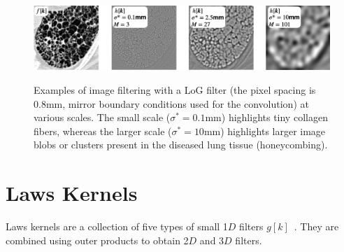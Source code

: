 \documentclass[fleqn,a4paper,oneside,openany]{book}
\begin{document}
%
\begin{figure}
\centering
\includegraphics[trim = 0 0 0 0, clip, width=\linewidth]{LoG_examples.png}\\
\caption{Examples of image filtering with a LoG filter (the pixel spacing is 0.8mm, mirror boundary conditions used for the convolution) at various scales.
The small scale ($\sigma^*=0.1$mm) highlights tiny collagen fibers, whereas the larger scale ($\sigma^*=10$mm) highlights larger image blobs or clusters present in the diseased lung tissue (honeycombing).}
  \label{fig:LoG_examples}
\end{figure}
%
%
\section{Laws Kernels}
%
Laws kernels are a collection of five types of small 1$D$ filters $g[k]$~\cite{Law1980}.
They are combined using outer products to obtain 2$D$ and 3$D$ filters.
\end{document}
